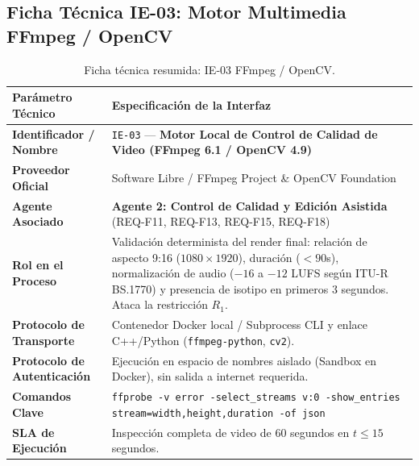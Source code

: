 \documentclass[11pt,a4paper]{article}
\begin{document}
\subsection{Ficha Técnica IE-03: Motor Multimedia FFmpeg / OpenCV}\label{sec:ie03}
\begin{table}[h!]
\centering
\small
\begin{tabular}{p{4.5cm} p{11cm}}
\toprule
\textbf{Parámetro Técnico} & \textbf{Especificación de la Interfaz} \\
\midrule
\textbf{Identificador / Nombre} & \texttt{IE-03} --- \textbf{Motor Local de Control de Calidad de Video (FFmpeg 6.1 / OpenCV 4.9)} \\
\textbf{Proveedor Oficial} & Software Libre / FFmpeg Project \& OpenCV Foundation \\
\textbf{Agente Asociado} & \textbf{Agente 2: Control de Calidad y Edición Asistida} (REQ-F11, REQ-F13, REQ-F15, REQ-F18) \\
\textbf{Rol en el Proceso} & Validación determinista del render final: relación de aspecto 9:16 ($1080 \times 1920$), duración ($<90$s), normalización de audio ($-16$ a $-12$ LUFS según ITU-R BS.1770) y presencia de isotipo en primeros 3 segundos. Ataca la restricción $R_1$. \\
\textbf{Protocolo de Transporte} & Contenedor Docker local / Subprocess CLI y enlace C++/Python (\texttt{ffmpeg-python}, \texttt{cv2}). \\
\textbf{Protocolo de Autenticación} & Ejecución en espacio de nombres aislado (Sandbox en Docker), sin salida a internet requerida. \\
\textbf{Comandos Clave} & \texttt{ffprobe -v error -select\_streams v:0 -show\_entries stream=width,height,duration -of json} \\
\textbf{SLA de Ejecución} & Inspección completa de video de 60 segundos en $t \le 15$ segundos. \\
\bottomrule
\end{tabular}
\caption{Ficha técnica resumida: IE-03 FFmpeg / OpenCV.}
\end{table}
\end{document}
